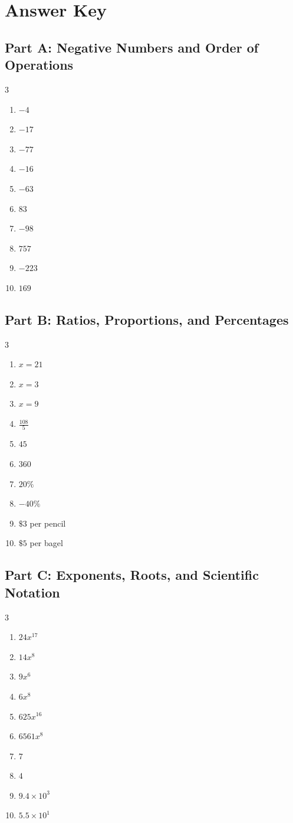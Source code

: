 \documentclass[11pt]{article}
\begin{document}
\newpage
{}
\section*{Answer Key}
\subsection*{Part A: Negative Numbers and Order of Operations}
\begin{multicols}{3}
\begin{enumerate}
  \item $-4$
  \item $-17$
  \item $-77$
  \item $-16$
  \item $-63$
  \item $83$
  \item $-98$
  \item $757$
  \item $-223$
  \item $169$
\end{enumerate}
\end{multicols}
\subsection*{Part B: Ratios, Proportions, and Percentages}
\begin{multicols}{3}
\begin{enumerate}
  \item $x = 21$
  \item $x = 3$
  \item $x = 9$
  \item $\frac{108}{5}$
  \item $45$
  \item $360$
  \item $20\%$
  \item $-40\%$
  \item $\$3$ per pencil
  \item $\$5$ per bagel
\end{enumerate}
\end{multicols}
\subsection*{Part C: Exponents, Roots, and Scientific Notation}
\begin{multicols}{3}
\begin{enumerate}
  \item $24 x^{17}$
  \item $14 x^{8}$
  \item $9 x^{6}$
  \item $6 x^{8}$
  \item $625 x^{16}$
  \item $6561 x^{8}$
  \item $7$
  \item $4$
  \item $9.4 \times 10^{3}$
  \item $5.5 \times 10^{1}$
\end{enumerate}
\end{multicols}
\end{document}
